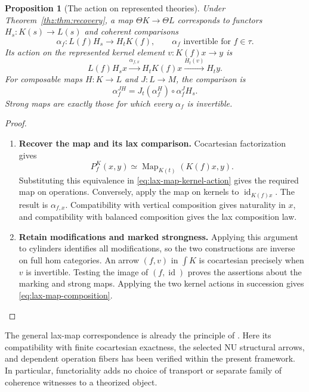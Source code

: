 \documentclass[oneside]{article}
\theoremstyle{plain}
\newtheorem{proposition}[theorem]{Proposition}
\theoremstyle{definition}
\theoremstyle{remark}
\newcommand{\Map}{\operatorname{Map}}
\newcommand{\id}{\operatorname{id}}
\begin{document}
\begin{proposition}[The action on represented theories]
\label{prop:represented-functoriality-explicit}
Under Theorem~\ref{thz:thm:recovery}, a map $\Theta K\to\Theta L$
corresponds to functors $H_s:K(s)\to L(s)$ and coherent comparisons
\[
 \alpha_f:L(f)H_s\longrightarrow H_tK(f),
 \qquad \alpha_f\text{ invertible for }f\in\tau.
\]
Its action on the represented kernel element $v:K(f)x\to y$ is
\begin{equation}\label{eq:lax-map-kernel-action}
 L(f)H_sx\xrightarrow{\alpha_{f,x}}H_tK(f)x
       \xrightarrow{H_t(v)}H_ty.
\end{equation}
For composable maps $H:K\to L$ and $J:L\to M$, the comparison is
\begin{equation}\label{eq:lax-map-composition}
 \alpha_f^{JH}=J_t(\alpha_f^H)\circ\alpha_f^JH_s.
\end{equation}
Strong maps are exactly those for which every $\alpha_f$ is invertible.
\end{proposition}
\begin{proof}
\leavevmode
\begin{enumerate}
\item \textbf{Recover the map and its lax comparison.}
Cocartesian factorization gives
\[
 P_f^K(x,y)\simeq\Map_{K(t)}(K(f)x,y).
\]
Substituting this equivalence in
\eqref{eq:lax-map-kernel-action} gives the required map on operations.
Conversely, apply the map on kernels to $\id_{K(f)x}$. The result is
$\alpha_{f,x}$. Compatibility with vertical composition gives naturality
in $x$, and compatibility with balanced composition gives the lax
composition law. 
\item \textbf{Retain modifications and marked strongness.}
Applying this argument to cylinders identifies all
modifications, so the two constructions are inverse on full hom
categories. An arrow $(f,v)$ in $\int K$ is cocartesian precisely when
$v$ is invertible. Testing the image of $(f,\id)$ proves the assertions
about the marking and strong maps. Applying the two kernel actions in
succession gives \eqref{eq:lax-map-composition}.
\qedhere
\end{enumerate}
\end{proof}

The general lax-map correspondence is already the principle of
\cite[Theorem~2.14]{Matsuoka2017}. Here its compatibility with finite
cocartesian exactness, the selected NU structural arrows, and dependent
operation fibers has been verified within the present framework. In
particular, functoriality adds no choice of transport or separate family
of coherence witnesses to a theorized object.
\end{document}
